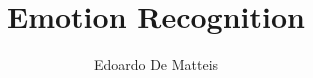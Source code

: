 \documentclass{article}
\title{Emotion Recognition}
\author{Edoardo De Matteis}
\date{}
\begin{document}
    \maketitle

    \tableofcontents
    \clearpage

    
    
    
    
    

    {}
    
\end{document}
